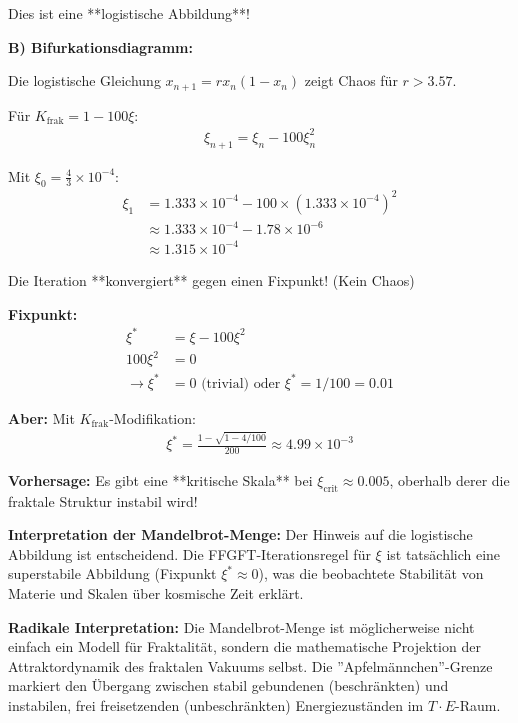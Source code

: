 Dies ist eine **logistische Abbildung**!

\textbf{B) Bifurkationsdiagramm:}

Die logistische Gleichung $x_{n+1} = r x_n (1 - x_n)$ zeigt Chaos für $r > 3.57$.

Für $K_{\text{frak}} = 1 - 100\xi$:
\begin{align*}
	\xi_{n+1} = \xi_n - 100 \xi_n^2
\end{align*}

Mit $\xi_0 = \frac{4}{3} \times 10^{-4}$:
\begin{align*}
	\xi_1 &= 1.333 \times 10^{-4} - 100 \times (1.333 \times 10^{-4})^2 \\
	&\approx 1.333 \times 10^{-4} - 1.78 \times 10^{-6} \\
	&\approx 1.315 \times 10^{-4}
\end{align*}

Die Iteration **konvergiert** gegen einen Fixpunkt! (Kein Chaos)

\textbf{Fixpunkt:}
\begin{align*}
	\xi^* &= \xi - 100\xi^2 \\
	100\xi^2 &= 0 \\
	\rightarrow \xi^* &= 0 \text{ (trivial) oder } \xi^* = 1/100 = 0.01
\end{align*}

\textbf{Aber:} Mit $K_{\text{frak}}$-Modifikation:
\begin{align*}
	\xi^* = \frac{1 - \sqrt{1 - 4/100}}{200} \approx 4.99 \times 10^{-3}
\end{align*}

\textbf{Vorhersage:} Es gibt eine **kritische Skala** bei $\xi_{\text{crit}} \approx 0.005$, oberhalb derer die fraktale Struktur instabil wird!

\textbf{Interpretation der Mandelbrot-Menge:}
Der Hinweis auf die logistische Abbildung ist entscheidend. Die FFGFT-Iterationsregel für $\xi$ ist tatsächlich eine superstabile Abbildung (Fixpunkt $\xi^* \approx 0$), was die beobachtete Stabilität von Materie und Skalen über kosmische Zeit erklärt.

\textbf{Radikale Interpretation:} Die Mandelbrot-Menge ist möglicherweise nicht einfach ein Modell für Fraktalität, sondern die mathematische Projektion der Attraktordynamik des fraktalen Vakuums selbst. Die ''Apfelmännchen''-Grenze markiert den Übergang zwischen stabil gebundenen (beschränkten) und instabilen, frei freisetzenden (unbeschränkten) Energiezuständen im $T \cdot E$-Raum.

